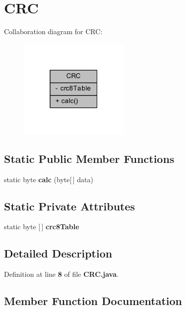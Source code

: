 \section{C\+RC}
\label{classch_1_1bfh_1_1gr33nopo55um_1_1enocean_1_1helper_1_1CRC}


Collaboration diagram for C\+RC\+:\nopagebreak
\begin{figure}[H]
\begin{center}
\leavevmode
\includegraphics[width=151pt]{d2/df5/classch_1_1bfh_1_1gr33nopo55um_1_1enocean_1_1helper_1_1CRC__coll__graph}
\end{center}
\end{figure}
\subsection*{Static Public Member Functions}
\begin{DoxyCompactItemize}
\item 
static byte {\bf calc} (byte[$\,$] data)
\end{DoxyCompactItemize}
\subsection*{Static Private Attributes}
\begin{DoxyCompactItemize}
\item 
static byte [$\,$] {\bf crc8\+Table}
\end{DoxyCompactItemize}


\subsection{Detailed Description}


Definition at line {\bf 8} of file {\bf C\+R\+C.\+java}.



\subsection{Member Function Documentation}
\label{classch_1_1bfh_1_1gr33nopo55um_1_1enocean_1_1helper_1_1CRC_a637a5507ae52f99f1326f24dacb3e454} 
